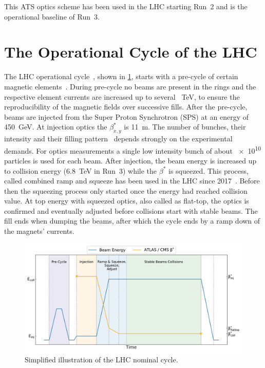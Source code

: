 This ATS optics scheme has been used in the LHC starting Run~\num{2} and is the operational baseline of Run~\num{3}.


\section{The Operational Cycle of the LHC}
\label{section:lhc_operational_cycle}

The LHC operational cycle~\cite{Report:LHCModes}, shown in \cref{figure:lhc_cycle}, starts with a pre-cycle of certain magnetic elements~\cite{Report:LHCMagnetsPreCycles}.
During pre-cycle no beams are present in the rings and the respective element currents are increased up to several \qty{}{\tera\electronvolt}, to ensure the reproducibility of the magnetic fields over successive fills.
After the pre-cycle, beams are injected from the Super Proton Synchrotron (SPS) at an energy of \qty{450}{\giga\electronvolt}.
At injection optics the \(\beta^{\ast}_{x,y}\) is \qty{11}{\metre}.
The number of bunches, their intensity and their filling pattern~\cite{Report:LHCStandardFillingSchemes} depends strongly on the experimental demands.
For optics measurements a single low intensity bunch of about \num{e10} particles is used for each beam.
After injection, the beam energy is increased up to collision energy (\qty{6.8}{\tera\electronvolt} in Run~3) while the \(\beta^{\ast}\) is squeezed.
This process, called combined ramp and squeeze has been used in the LHC since 2017~\cite{IPAC:Camillocci:CombinedRampAndSqueeze}.
Before then the squeezing process only started once the energy had reached collision value.
At top energy with squeezed optics, also called as flat-top, the optics is confirmed and eventually adjusted before collisions start with stable beams.
The fill ends when dumping the beams, after which the cycle ends by a ramp down of the magnets' currents.

\begin{figure}[!h]
    \centering
    \includegraphics*[width=0.9\linewidth]{Figures/Optics_Measurements_Corrections_at_LHC/lhc_cycle.pdf}
    \caption{Simplified illustration of the LHC nominal cycle.}
    \label{figure:lhc_cycle}
\end{figure}

